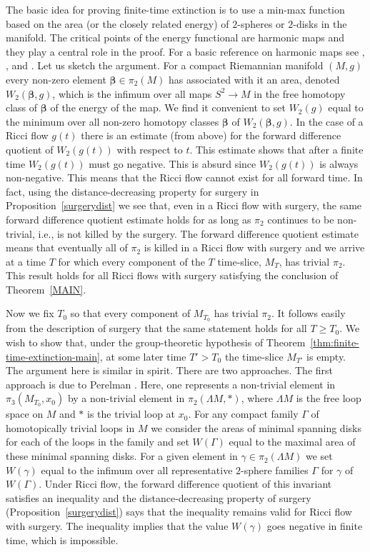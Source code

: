 The basic idea for proving finite-time extinction is to use a min-max function
based on the area (or the closely related energy) of $2$-spheres or $2$-disks
in the manifold. The critical points of the energy functional are harmonic maps
and they play a central role in the proof. For a basic reference on harmonic
maps see \cite{SacksUhlenbeck}, \cite{SchoenYau}, and \cite{Jost}. Let us
sketch the argument. For a compact Riemannian manifold $(M,g)$ every non-zero
element $\boldsymbol{\beta}\in \pi_2(M)$ has associated with it an area, denoted
$W_2(\boldsymbol{\beta},g)$, which is the infimum over all maps $S^2\to M$ in the free
homotopy class of $\boldsymbol{\beta}$ of the energy of the map. We find it convenient to
set $W_2(g)$ equal to the minimum over all non-zero homotopy classes $\boldsymbol{\beta}$
of $W_2(\boldsymbol{\beta},g)$. In the case of a Ricci flow $g(t)$ there is an estimate
(from above) for the forward difference quotient of $W_2(g(t))$ with respect to
$t$. This estimate shows that after a finite time $W_2(g(t))$ must go negative.
This  is absurd since $W_2(g(t))$ is  always non-negative. This means that the
Ricci flow cannot exist for all forward time. In fact, using the
distance-decreasing property for surgery in Proposition~\ref{surgerydist} we
see that, even in a Ricci flow with surgery, the same forward difference
quotient estimate holds for as long as  $\pi_2$ continues to be non-trivial,
i.e., is not killed by the surgery. The forward difference quotient estimate
means that eventually all of $\pi_2$ is killed in a Ricci flow with surgery and
we arrive at a time $T$ for which every component of the $T$ time-slice, $M_T$,
has trivial $\pi_2$. This result holds for all Ricci flows with surgery
satisfying the conclusion of Theorem~\ref{MAIN}.

Now we fix $T_0$ so that every component of $M_{T_0}$ has trivial
$\pi_2$. It follows easily from the description of surgery that the
same statement holds for all $T\ge T_0$. We wish to show that, under
the group-theoretic hypothesis of Theorem~\ref{thm:finite-time-extinction-main}, at some
later time $T'>T_0$ the time-slice $M_{T'}$ is empty. The argument
here is similar in spirit. There are two approaches. The first
approach is due to Perelman \cite{Perelman3}. Here, one represents a
non-trivial element in $\pi_3(M_{T_0},x_0)$ by  a non-trivial
element in $\pi_2(\Lambda M,*)$, where $\Lambda M$ is the free loop
space on $M$ and $*$ is the trivial loop at $x_0$. For any compact
family $\Gamma$ of homotopically trivial loops in $M$ we consider
the areas of minimal spanning disks for each of the loops in the
family and set $W(\Gamma)$ equal to the maximal area of these
minimal spanning disks. For a given element in $\gamma\in
\pi_2(\Lambda M)$ we set $W(\gamma)$ equal to
 the infimum over all representative $2$-sphere families $\Gamma$
for $\gamma$  of $W(\Gamma)$. Under Ricci flow, the forward
difference quotient of this invariant satisfies an inequality and
the distance-decreasing property of surgery
(Proposition~\ref{surgerydist}) says that the inequality remains
valid for Ricci flow with surgery. The inequality implies that the
value $W(\gamma)$ goes negative in finite time, which is impossible.

